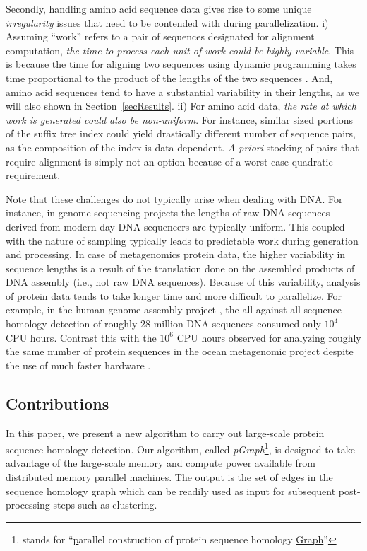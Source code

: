 \documentclass[10pt,journal,letterpaper,compsoc]{IEEEtran}
\begin{document}
Secondly, handling amino acid sequence data gives rise to some unique \emph{irregularity} issues that need to be contended with during parallelization. i) Assuming ``work'' refers to a pair of sequences designated for alignment computation, \emph{the time to process each unit of work could be highly variable}. This is because the time for aligning two sequences using dynamic programming takes time proportional to the product of the lengths of the two sequences \cite{Needleman70,Smith81}. And, amino acid sequences tend to have a substantial variability in their lengths, as we will also shown in Section~\ref{secResults}. 
ii) For amino acid data, \emph{the rate at which work is generated could also be non-uniform}. For instance, similar sized portions of the suffix tree index could yield drastically different number of sequence pairs, as the composition of the index is data dependent. {\it A priori} stocking of pairs that require alignment is simply not an option because of a worst-case quadratic requirement.

Note that these challenges do not typically arise when dealing with DNA. For instance, in genome sequencing projects the lengths of raw DNA sequences derived from modern day DNA sequencers are typically uniform. This coupled with the nature of sampling typically leads to predictable work during generation and processing. In case of metagenomics protein data, the higher variability in sequence lengths is a result of the translation done on the assembled products of DNA assembly (i.e., not raw DNA sequences). Because of this variability, analysis of protein data tends to take longer time and more difficult to parallelize. For example, in the human genome assembly project \cite{Venter01}, the all-against-all sequence homology detection of roughly 28 million DNA sequences consumed only $10^4$ CPU hours. Contrast this with the $10^6$ CPU hours observed for analyzing roughly the same number of protein sequences in the ocean metagenomic project despite the use of much faster hardware \cite{Yooseph07}.


\subsection{Contributions}
\label{secContributions}


In this paper, we present a new algorithm to carry out large-scale protein sequence homology detection. Our algorithm, called {\it pGraph}\footnote{stands for ``\underline{p}arallel construction of protein sequence homology \underline{Graph}''}, is designed to take advantage of the large-scale memory and compute power available from distributed memory parallel machines. The output is the set of edges in the sequence homology graph which can be readily used as input for subsequent post-processing steps such as clustering. 
\end{document}
